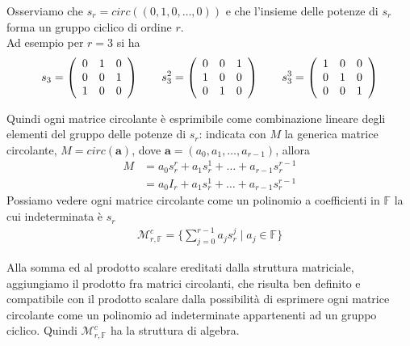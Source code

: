 \noindent
Osserviamo che $s_{r} = circ((0,1,0, \dots, 0))$ e che l'insieme delle potenze
di $s_{r}$ forma un gruppo ciclico di ordine $r$. \\
Ad esempio per $r=3$ si ha
\begin{align*}
s_3 =
\left(
\begin{array} {c c c  }
0 & 1 &  0   \\
0 & 0 & 1   \\
1 & 0 & 0   \\
\end{array}
\right)
\qquad
s_3^2 =
\left(
\begin{array} {c c c  }
0 & 0 & 1   \\
1 & 0 & 0   \\
0 & 1 & 0   \\
\end{array}
\right)
\qquad
s_3^3 =
\left(
\begin{array} {c c c  }
1 & 0 & 0   \\
0 & 1 & 0   \\
0 & 0 & 1   \\
\end{array}
\right)
\end{align*}

\noindent
Quindi ogni matrice circolante è esprimibile
come combinazione lineare degli elementi del gruppo delle potenze di $s_r$:
indicata con $M$ la generica matrice circolante, $M = circ( \mathbf{a} )
$, dove $\mathbf{a} = (a_0, a_1, \dots, a_{r-1} )$, allora
\begin{align*}
M &= a_0  s_{r}^{r} + a_1  s_{r}^{1} + \dots + a_{r-1} s_{r}^{r-1} \\
&= a_0  I_{r} + a_1  s_{r}^{1} + \dots + a_{r-1}  s_{r}^{r-1}
\end{align*}
Possiamo vedere ogni matrice circolante come un
polinomio a coefficienti in $\mathbb{F}$ la cui indeterminata è $s_{r}$
\begin{align*}
\mathcal{M}_{r,\mathbb{F} }^{c} = \lbrace \sum_{j=0}^{r-1} a_{j}s_{r}^{j} \mid
a_{j}
\in \mathbb{F} \rbrace
\end{align*}

\noindent
Alla somma ed al prodotto scalare ereditati dalla struttura matriciale,
aggiungiamo il prodotto fra matrici circolanti, che risulta
ben definito e compatibile con il prodotto scalare dalla possibilità di esprimere
ogni matrice circolante come un polinomio ad indeterminate appartenenti ad un
gruppo ciclico.
Quindi $\mathcal{M}_{r,\mathbb{F}}^{c}$ ha la struttura di algebra.

